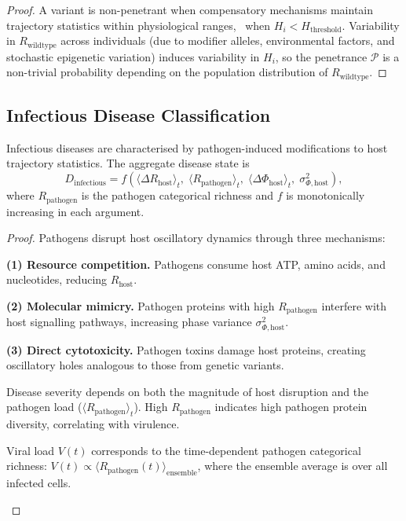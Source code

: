 \begin{proof}
A variant is non-penetrant when compensatory mechanisms maintain trajectory
statistics within physiological ranges, \ie\ when $H_i <
H_{\mathrm{threshold}}$.  Variability in $R_{\mathrm{wildtype}}$ across
individuals (due to modifier alleles, environmental factors, and stochastic
epigenetic variation) induces variability in $H_i$, so the penetrance
$\mathcal{P}$ is a non-trivial probability depending on the population
distribution of $R_{\mathrm{wildtype}}$.
\end{proof}

\subsection{Infectious Disease Classification}
\label{sec:ch07-infectious-disease}

\begin{theorem}
\label{thm:ch07-infectious-disease}
Infectious diseases are characterised by pathogen-induced modifications to
host trajectory statistics.  The aggregate disease state is
\begin{equation}
  D_{\mathrm{infectious}}
  = f\!\left(
      \langle\Delta R_{\mathrm{host}}\rangle_t,\;
      \langle R_{\mathrm{pathogen}}\rangle_t,\;
      \langle\Delta\Phi_{\mathrm{host}}\rangle_t,\;
      \sigma_{\Phi,\mathrm{host}}^{2}
    \right),
  \label{eq:ch07-infectious-disease}
\end{equation}
where $R_{\mathrm{pathogen}}$ is the pathogen categorical richness and
$f$ is monotonically increasing in each argument.
\end{theorem}

\begin{proof}
Pathogens disrupt host oscillatory dynamics through three mechanisms:

\textbf{(1) Resource competition.}  Pathogens consume host ATP, amino
acids, and nucleotides, reducing $R_{\mathrm{host}}$.

\textbf{(2) Molecular mimicry.}  Pathogen proteins with high
$R_{\mathrm{pathogen}}$ interfere with host signalling pathways, increasing
phase variance $\sigma_{\Phi,\mathrm{host}}^2$.

\textbf{(3) Direct cytotoxicity.}  Pathogen toxins damage host proteins,
creating oscillatory holes analogous to those from genetic variants.

Disease severity depends on both the magnitude of host disruption and the
pathogen load ($\langle R_{\mathrm{pathogen}}\rangle_t$).  High
$R_{\mathrm{pathogen}}$ indicates high pathogen protein diversity,
correlating with virulence.

\begin{remark}
Viral load $V(t)$ corresponds to the time-dependent pathogen categorical
richness: $V(t) \propto \langle R_{\mathrm{pathogen}}(t)
\rangle_{\mathrm{ensemble}}$, where the ensemble average is over all
infected cells.
\end{remark}
\end{proof}

